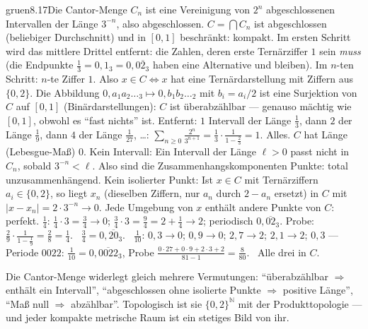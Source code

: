 \begin{loesungkarte}{gruen}{8.17}{Die Cantor-Menge}
$C_n$ ist eine Vereinigung von $2^{n}$ abgeschlossenen Intervallen der Länge $3^{-n}$, also abgeschlossen. $C = \bigcap C_n$ ist abgeschlossen (beliebiger Durchschnitt) und in $[0, 1]$ beschränkt: kompakt. \checkmark
{}
Im ersten Schritt wird das mittlere Drittel entfernt: die Zahlen, deren erste Ternärziffer $1$ sein \emph{muss} (die Endpunkte $\frac13 = 0{,}1_3 = 0{,}0\overline2_3$ haben eine Alternative und bleiben). Im $n$-ten Schritt: $n$-te Ziffer $1$. Also $x\in C\iff x$ hat eine Ternärdarstellung mit Ziffern aus $\{0, 2\}$. Die Abbildung $0{,}a_1a_2\dots_3\mapsto0{,}b_1b_2\dots_2$ mit $b_i = a_i/2$ ist eine Surjektion von $C$ auf $[0, 1]$ (Binärdarstellungen): $C$ ist überabzählbar --- genauso mächtig wie $[0, 1]$, obwohl es \enquote{fast nichts} ist.
Entfernt: $1$ Intervall der Länge $\frac13$, dann $2$ der Länge $\frac19$, dann $4$ der Länge $\frac1{27}$, \dots: $\sum_{n\ge0}\frac{2^{n}}{3^{n+1}} = \frac13\cdot\frac1{1 - \frac23} = 1$. Alles. $C$ hat Länge (Lebesgue-Maß) $0$.
Kein Intervall: Ein Intervall der Länge $\ell > 0$ passt nicht in $C_n$, sobald $3^{-n} < \ell$. Also sind die Zusammenhangskomponenten Punkte: total unzusammenhängend. Kein isolierter Punkt: Ist $x\in C$ mit Ternärziffern $a_i\in\{0, 2\}$, so liegt $x_n$ (dieselben Ziffern, nur $a_n$ durch $2 - a_n$ ersetzt) in $C$ mit $|x - x_n| = 2\cdot3^{-n}\to0$. Jede Umgebung von $x$ enthält andere Punkte von $C$: perfekt.
$\frac14$: $\frac14\cdot3 = \frac34\to0$; $\frac34\cdot3 = \frac94 = 2 + \frac14\to2$; periodisch $0{,}\overline{02}_3$. Probe: $\frac{2}{9}\cdot\frac1{1 - \frac19} = \frac28 = \frac14$. \checkmark\ $\frac34 = 0{,}\overline{20}_3$. \checkmark\ $\frac1{10}$: $0{,}3\to0$; $0{,}9\to0$; $2{,}7\to2$; $2{,}1\to2$; $0{,}3$ --- Periode $0022$: $\frac1{10} = 0{,}\overline{0022}_3$, Probe $\frac{0\cdot27 + 0\cdot9 + 2\cdot3 + 2}{81 - 1} = \frac8{80}$. \checkmark\ Alle drei in $C$.
\begin{mitnehmen}\kastentext
Die Cantor-Menge widerlegt gleich mehrere Vermutungen: \enquote{überabzählbar $\Rightarrow$ enthält ein Intervall}, \enquote{abgeschlossen ohne isolierte Punkte $\Rightarrow$ positive Länge}, \enquote{Maß null $\Rightarrow$ abzählbar}. Topologisch ist sie $\{0, 2\}^{\mathbb N}$ mit der Produkttopologie --- und jeder kompakte metrische Raum ist ein stetiges Bild von ihr.
\end{mitnehmen}
\end{loesungkarte}

